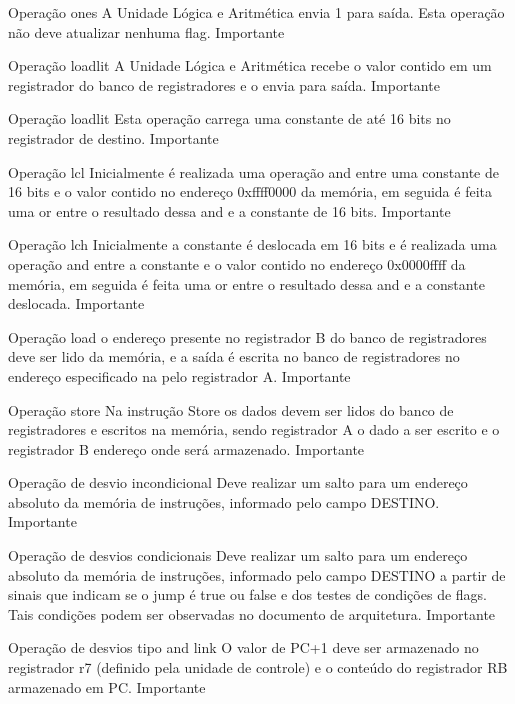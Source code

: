 \documentclass{report}
\begin{document}
\begin{functional}
      \requirement
      {Operação ones}
      {A Unidade Lógica e Aritmética envia 1 para saída. Esta operação não deve atualizar nenhuma flag.}
      {Importante}
      
      \requirement
      {Operação loadlit}
      {A Unidade Lógica e Aritmética recebe o valor contido em um registrador do banco de registradores e o envia para saída.}
      {Importante}
      
      \requirement
      {Operação loadlit}
      {Esta operação carrega uma constante de até 16 bits no registrador de destino.}
      {Importante}
      
       \requirement
      {Operação lcl}
      {Inicialmente é realizada uma operação and entre uma constante de 16 bits e o valor contido no endereço 0xffff0000 da memória, em seguida é feita uma or entre o resultado dessa and e a constante de 16 bits.}
      {Importante}
      
       \requirement
      {Operação lch}
      {Inicialmente a constante é deslocada em 16 bits e é realizada uma operação and entre a constante e o valor contido no endereço 0x0000ffff da memória, em seguida é feita uma or entre o resultado dessa and e a constante deslocada.}
      {Importante}
      
       \requirement
      {Operação load}
      {o endereço presente no registrador B do banco de registradores deve ser lido da memória, e a saída é escrita no banco de registradores no endereço especificado na pelo registrador A.}
      {Importante}
      
      \requirement
      {Operação store}
      {Na instrução Store os dados devem ser lidos do banco de registradores e escritos na memória, sendo registrador A o dado a ser escrito e o registrador B endereço onde será armazenado.}
      {Importante}
      
       \requirement
      {Operação de desvio incondicional}
      {Deve realizar um salto para um endereço absoluto da memória de instruções, informado pelo campo DESTINO.}
      {Importante}
      
       \requirement
      {Operação de desvios condicionais}
      {Deve realizar um salto para um endereço absoluto da memória de instruções, informado pelo campo DESTINO a partir de sinais que indicam se o jump é true ou false e dos testes de condições de flags. Tais condições podem ser observadas no documento de arquitetura.}
      {Importante}
      
      \requirement
      {Operação de desvios tipo and link}
      {O valor de PC+1 deve ser armazenado no registrador r7 (definido pela unidade de controle) e o conteúdo do registrador RB armazenado em PC.}
      {Importante}
      

\end{functional}
\end{document}
